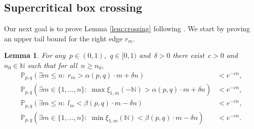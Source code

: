 \documentclass[pdflatex,sn-mathphys-num]{sn-jnl}%
\newcommand{\bbN}{{\ensuremath{\mathbb N}} }
\newcommand{\bbP}{{\ensuremath{\mathbb P}} }
\newcommand{\1}{{\ensuremath{\mathbf{1}}} }
\theoremstyle{thmstyleone}%
\newtheorem{lemma}[theorem]{Lemma}%
\theoremstyle{thmstyletwo}%
\theoremstyle{thmstylethree}%
\begin{document}
\subsection{Supercritical box crossing}
\label{app:box}
Our next goal is to prove Lemma \ref{lem:crossing} following \cite{Durrett84}. We start by proving an upper tail bound for the right edge $r_m$.
\begin{lemma}\label{lem_bound_speed}
For any~$p \in (0,1)$,~$q \in [0,1)$ and~$\delta > 0$ there exist~$c > 0$ and~$n_0 \in \bbN$ such that for all~$n \ge n_0$,
\begin{align}\label{eq_max_ineq}
\bbP_{p,q}\left( \exists m \le n:\; r_m   > \alpha(p,q)\cdot  m+\delta n\right) &{}< e^{-cn},\\
\label{eq_max_ineq2}
\bbP_{p,q}\left( \exists m \in \{1,\ldots, n\}:\; \max \xi_{1,m}({-\bbN})  > \alpha(p,q)\cdot m +\delta n\right) &{}< e^{-cn},\\
\nonumber\bbP_{p,q}\left( \exists m \le n:\; l_m < \beta(p,q)\cdot  m - \delta n\right) &{}< e^{-cn},\\
\nonumber\bbP_{p,q}\left(\exists m \in \{1,\ldots, n\}: \;\min \xi_{1,m}(\bbN) < \beta(p,q)\cdot m - \delta n \right)&{}< e^{-cn}.
\end{align}
\end{lemma}
\end{document}
